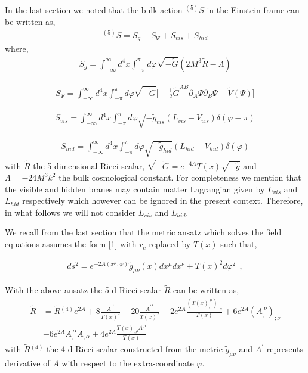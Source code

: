 \documentclass{article}
\begin{document}
In the last section we noted that the bulk action $^{(5)}{S}$ in the Einstein frame can be written as,
\begin{align}
^{(5)}{S}={S}_{g}+S_{\Psi} + {S}_{vis}+{S}_{hid} \label{Eq4}
\end{align}
where,
\begin{align}
{S}_{g}=\int_{-\infty} ^{\infty} d^4x \int_{-\pi} ^{\pi} d\varphi \sqrt{-\tilde{G}}(2M^3 {\tilde{ R}} - \Lambda ) \label{Eq5}
\end{align}

\begin{align}
S_{\Psi}=\int_{-\infty} ^{\infty} d^4x \int_{-\pi} ^{\pi} d\varphi \sqrt{-\tilde{G}}\bigg[-\frac{1}{2}\tilde{G}^{AB}\partial_{A}\Psi \partial_{B}\Psi - \tilde{ V}(\Psi)\bigg] 
\label{Eq5a}
\end{align}

\begin{align}
{S}_{vis}=\int_{-\infty}^{\infty} d^4x \int_{-\pi} ^{\pi} d\varphi \sqrt{-\tilde{g}_{vis}} (L_{vis} -V_{vis}) \delta(\varphi-\pi)  \label{Eq6}
\end{align}

\begin{align}
{S}_{hid}=\int_{-\infty}^{\infty} d^4x  \int_{-\pi} ^{\pi} d\varphi  \sqrt{-\tilde{g}_{hid}}(L_{hid} -V_{hid})\delta(\varphi)  \label{Eq7}
\end{align}
with $\tilde{R}$ the 5-dimensional Ricci scalar, $\sqrt{-\tilde{G}}=e^{-4A}T(x)\sqrt{-\tilde{g}}$ and $\Lambda=-24M^3k^2$ the bulk cosmological constant. For completeness we mention that the visible and hidden branes may contain matter Lagrangian given by $L_{vis}$ and $L_{hid}$ respectively which however can be ignored in the present context. Therefore, in what follows we will not consider $L_{vis}$ and $L_{hid}$.

We recall from the last section that the metric ansatz which solves the field equations assumes the form \ref{1} with $r_c$ replaced by $T(x)$ such that,

\begin{align}
 ds^2 = e^{-2A(x^\mu,\varphi)}\tilde{g}_{\mu\nu}(x)dx^{\mu}dx^{\nu} + T(x)^2d\varphi^2~~,
 \label{Eq8}
\end{align}

With the above ansatz the 5-d Ricci scalar $\tilde{R}$ can be written as,
\begin{align}
{\tilde{ R}}&= \tilde{R}{^{(4)}}e^{2A} + 8\frac{A^{\prime\prime}}{T(x)^2}-20\frac{{A^{\prime}}^2}{T(x)^2}-2e^{2A}\frac{(T(x)_,^{~\mu})_{;\mu}}{T(x)} +6e^{2A}(A_,^{~\nu})_{;\nu} \nonumber \\ &
-6e^{2A} A_,^{~\alpha} A_{,\alpha}+4e^{2A}\frac{T(x)_{,\rho}A^{~\rho}}{T(x)}  \label{Eq9}
\end{align}
with $\tilde{R}{^{(4)}}$ the 4-d Ricci scalar constructed from the metric $\tilde{g}_{\mu\nu}$ and ${A^{\prime}}$ represents derivative of $A$ with respect to the extra-coordinate $\varphi$.
\end{document}
